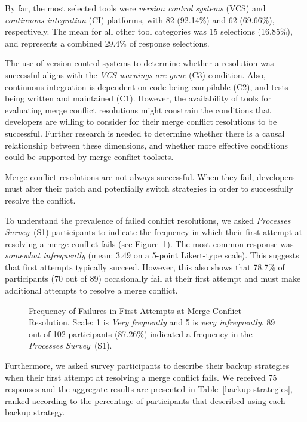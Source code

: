 By far, the most selected tools were \textit{version control systems} (VCS) and \textit{continuous integration} (CI) platforms, with 82 (92.14\%) and 62 (69.66\%), respectively.
The mean for all other tool categories was 15 selections (16.85\%), and represents a combined 29.4\% of response selections.

The use of version control systems to determine whether a resolution was successful aligns with the \textit{VCS warnings are gone} (C3) condition.
Also, continuous integration is dependent on code being compilable (C2), and tests being written and maintained (C1).
However, the availability of tools for evaluating merge conflict resolutions might constrain the conditions that developers are willing to consider for their merge conflict resolutions to be successful.
Further research is needed to determine whether there is a causal relationship between these dimensions, and whether more effective conditions could be supported by merge conflict toolsets.


Merge conflict resolutions are not always successful.
When they fail, developers must alter their patch and potentially switch strategies in order to successfully resolve the conflict.

To understand the prevalence of failed conflict resolutions, we asked \textit{Processes Survey}~(S1) participants to indicate the frequency in which their first attempt at resolving a merge conflict fails (see Figure~\ref{fig:first-attempt-failure}).
The most common response was \textit{somewhat infrequently} (mean: $3.49$ on a 5-point Likert-type scale).
This suggests that first attempts typically succeed.
However, this also shows that 78.7\% of participants (70 out of 89) occasionally fail at their first attempt and must make additional attempts to resolve a merge conflict.

\begin{figure}
	\centering
	\caption{Frequency of Failures in First Attempts at Merge Conflict Resolution. Scale: 1 is \textit{Very frequently} and 5 is \textit{very infrequently}. 89 out of 102 participants (87.26\%) indicated a frequency in the \textit{Processes Survey}~(S1).\vspace*{-0.3\baselineskip}}
	\label{fig:first-attempt-failure}
\end{figure}

Furthermore, we asked survey participants to describe their backup strategies when their first attempt at resolving a merge conflict fails.
We received 75 responses and the aggregate results are presented in Table~\ref{backup-strategies}, ranked according to the percentage of participants that described using each backup strategy.

